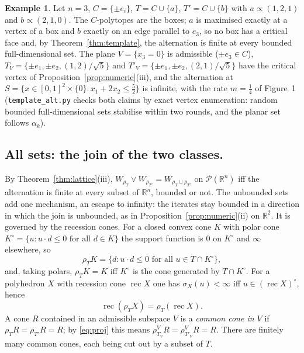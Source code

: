 \documentclass[11pt]{amsart}
\theoremstyle{definition}
\newtheorem{ex}[thm]{Example}
\newcommand{\cP}{\mathcal P}
\newcommand{\rec}{\operatorname{rec}}
\begin{document}
\begin{ex}\label{ex:lowdim}
Let $n=3$, $C=\{\pm e_i\}$, $T=C\cup\{a\}$, $T'=C\cup\{b\}$ with $a
\propto(1,2,1)$ and $b\propto(2,1,0)$. The $C$-polytopes are the boxes;
$a$ is maximised exactly at a vertex of a box and $b$ exactly on an
edge parallel to $e_3$, so no box has a critical face and, by
Theorem~\ref{thm:template}, the alternation is finite at every bounded
full-dimensional set. The plane $V=\{x_3=0\}$ is admissible ($\pm e_3
\in C$), $T_V=\{\pm e_1,\pm e_2,(1,2)/\sqrt5\}$ and $T'_V=\{\pm e_1,\pm
e_2,(2,1)/\sqrt5\}$ have the critical vertex of
Proposition~\ref{prop:numeric}(iii), and the alternation at $S=\{x\in
[0,1]^2\times\{0\}:x_1+2x_2\le\frac52\}$ is infinite, with the rate
$m=\frac14$ of Figure~1 (\texttt{template\_alt.py} checks both claims
by exact vertex enumeration: random bounded full-dimensional sets
stabilise within two rounds, and the planar set follows $\alpha_k$).
\end{ex}

\subsection*{All sets: the join of the two classes.}
By Theorem~\ref{thm:lattice}(iii), $W_{\rho_T}\vee W_{\rho_{T'}}=
W_{\rho_T\sqcup\rho_{T'}}$ on $\cP(\mathbb R^n)$ iff the alternation is
finite at every subset of $\mathbb R^n$, bounded or not. The unbounded
sets add one mechanism, an escape to infinity: the iterates stay
bounded in a direction in which the join is unbounded, as in
Proposition~\ref{prop:numeric}(ii) on $\mathbb R^2$. It is governed by
the recession cones. For a closed convex cone $K$ with polar cone
$K^\circ=\{u:u\cdot d\le0\text{ for all }d\in K\}$ the support function
is $0$ on $K^\circ$ and $\infty$ elsewhere, so
\[
\rho_TK=\{d:u\cdot d\le0\text{ for all }u\in T\cap K^\circ\},
\]
and, taking polars, $\rho_TK=K$ iff $K^\circ$ is the cone generated by
$T\cap K^\circ$. For a polyhedron $X$ with recession cone $\rec X$ one
has $\sigma_X(u)<\infty$ iff $u\in(\rec X)^\circ$, hence
\begin{equation}\label{eq:rec}
\rec(\rho_TX)=\rho_T(\rec X).
\end{equation}
A cone $R$ contained in an admissible subspace $V$ is a \emph{common
cone in $V$} if $\rho_TR=\rho_{T'}R=R$; by \eqref{eq:proj} this means
$\rho^V_{T_V}R=\rho^V_{T'_V}R=R$. There are finitely many common cones,
each being cut out by a subset of $T$.
\end{document}

